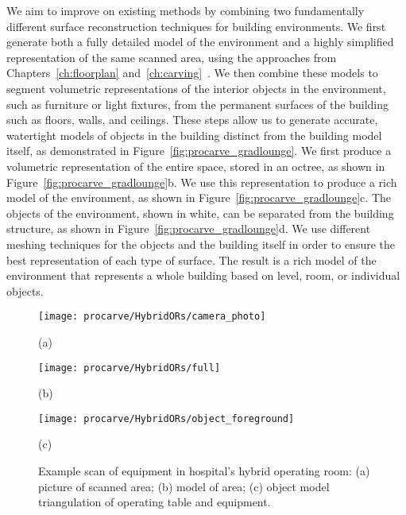 \documentclass[12pt,onecolumn,oneside]{book}
\begin{document}
We aim to improve on existing methods by combining two fundamentally different surface reconstruction techniques for building environments.  We first generate both a fully detailed model of the environment and a highly simplified representation of the same scanned area, using the approaches from Chapters~\ref{ch:floorplan} and~\ref{ch:carving}~\cite{Turner13,Turner14}.  We then combine these models to segment volumetric representations of the interior objects in the environment, such as furniture or light fixtures, from the permanent surfaces of the building such as floors, walls, and ceilings. These steps allow us to generate accurate, watertight models of objects in the building distinct from the building model itself, as demonstrated in Figure~\ref{fig:procarve_gradlounge}.  We first produce a volumetric representation of the entire space, stored in an octree, as shown in Figure~\ref{fig:procarve_gradlounge}b.  We use this representation to produce a rich model of the environment, as shown in Figure~\ref{fig:procarve_gradlounge}c.  The objects of the environment, shown in white, can be separated from the building structure, as shown in Figure~\ref{fig:procarve_gradlounge}d.  We use different meshing techniques for the objects and the building itself in order to ensure the best representation of each type of surface.  The result is a rich model of the environment that represents a whole building based on level, room, or individual objects.

\begin{figure}[t]

	\centering
	\begin{minipage}[t]{0.49\linewidth}
		\centerline{\texttt{[image: procarve/HybridORs/camera\_photo]}}
		\centerline{(a)}
	\end{minipage}
	\hfill
	\begin{minipage}[t]{0.49\linewidth}%
		\centerline{\texttt{[image: procarve/HybridORs/full]}}
		\centerline{(b)}
	\end{minipage}

	\begin{minipage}[t]{0.6\linewidth}
		\centerline{\texttt{[image: procarve/HybridORs/object\_foreground]}}
		\centerline{(c)}
	\end{minipage}

	\caption[Example scan of equipment in hospital operating room.]{Example scan of equipment in hospital's hybrid operating room: (a) picture of scanned area; (b) model of area; (c) object model triangulation of operating table and equipment.}
	\label{fig:procarve_hybrid}

\end{figure}
\end{document}
